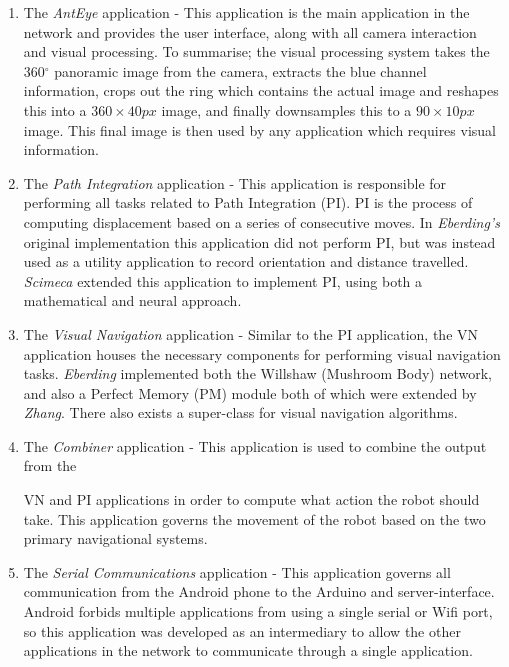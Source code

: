 \documentclass[a4paper,12pt]{article}
\begin{document}
\begin{enumerate}
\item{
    The \textit{AntEye} application - This application is the main application in the network and
    provides the user interface, along with all camera interaction and visual processing. To summarise;
    the visual processing system takes the 360$^{\circ}$ panoramic image from the camera, extracts
    the blue channel information, crops out the ring which contains the actual image and reshapes
    this into a $360\times40px$ image, and finally downsamples this to a $90\times10px$ image. This
    final image is then used by any application which requires visual information.
  }

\item{
    The \textit{Path Integration} application - This application is responsible for performing all
    tasks related to Path Integration (PI). PI is the process of computing displacement
    based on a series of consecutive moves. In \textit{Eberding's} original implementation this
    application did not perform PI, but was instead used as a utility application to record orientation
    and distance travelled. \textit{Scimeca} extended this application to implement PI, using both a
    mathematical and neural approach.
  }

\item{
    The \textit{Visual Navigation} application - Similar to the PI application, the VN application
    houses the necessary components for performing visual navigation tasks. \textit{Eberding}
    implemented both the Willshaw (Mushroom Body) network, and also a Perfect Memory (PM) module both
    of which were extended by \textit{Zhang}. There also exists a super-class for visual navigation
    algorithms.
    }

\item{
    The \textit{Combiner} application - This application is used to combine the output from the

    VN and PI applications in order to compute what action the robot should take. This application
    governs the movement of the robot based on the two primary navigational systems.
  }

\item{
    The \textit{Serial Communications} application - This application governs all communication from
    the Android phone to the Arduino and server-interface. Android forbids multiple applications from
    using a single serial or Wifi port, so this application was developed as an intermediary to allow
    the other applications in the network to communicate through a single application.
    }
\end{enumerate}
\end{document}
